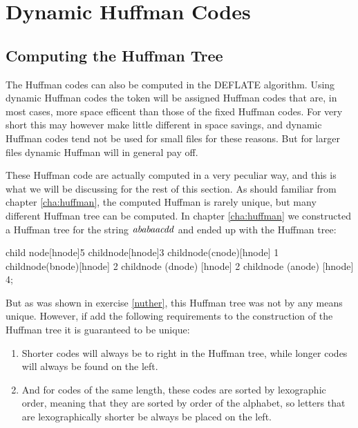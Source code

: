 \section{Dynamic Huffman Codes}
\label{sec:dynamic-huffman-codes}

\subsection{Computing the Huffman Tree}

The Huffman codes can also be computed in the DEFLATE algorithm. Using
dynamic Huffman codes the token will be assigned Huffman codes that
are, in most cases, more space efficent than those of the fixed
Huffman codes. For very short this may however make little different
in space savings, and dynamic Huffman codes tend not be used for small
files for these reasons. But for larger files dynamic Huffman will in
general pay off.

These Huffman code are actually computed in a very peculiar way, and
this is what we will be discussing for the rest of this section. As should
familiar from chapter \ref{cha:huffman}, the computed Huffman is
rarely unique, but many different Huffman tree can be computed. In
chapter \ref{cha:huffman} we constructed a Huffman tree for the string
$\mathit{ababaacdd}$ and ended up with the Huffman tree:

\begin{huffmanc}
  child {node[hnode]{5}
    child{node[hnode]{3}
      child{node(cnode)[hnode] {1}}
      child{node(bnode)[hnode] {2}}}
    child{node (dnode) [hnode] {2}}}
  child{node (anode) [hnode] {4}};

\end{huffmanc}

But as was shown in exercise \ref{nuther}, this Huffman tree was not
by any means unique. However, if add the following requirements to the
construction of the Huffman tree it is guaranteed to be unique:

\begin{enumerate}
\item Shorter codes will always be to right in the Huffman tree, while
  longer codes will always be found on the left.
\item And for codes of the same length, these codes are sorted by
  lexographic order, meaning that they are sorted by order of the
  alphabet, so letters that are lexographically shorter be always be
  placed on the left.
\end{enumerate}

